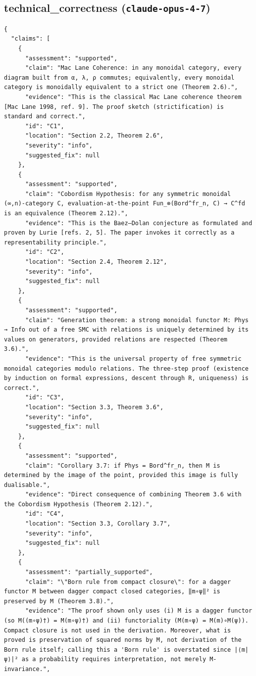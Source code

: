 \documentclass[11pt]{article}
\begin{document}
\subsection*{technical_correctness (\texttt{claude-opus-4-7})}
\begin{verbatim}
{
  "claims": [
    {
      "assessment": "supported",
      "claim": "Mac Lane Coherence: in any monoidal category, every diagram built from α, λ, ρ commutes; equivalently, every monoidal category is monoidally equivalent to a strict one (Theorem 2.6).",
      "evidence": "This is the classical Mac Lane coherence theorem [Mac Lane 1998, ref. 9]. The proof sketch (strictification) is standard and correct.",
      "id": "C1",
      "location": "Section 2.2, Theorem 2.6",
      "severity": "info",
      "suggested_fix": null
    },
    {
      "assessment": "supported",
      "claim": "Cobordism Hypothesis: for any symmetric monoidal (∞,n)-category C, evaluation-at-the-point Fun_⊗(Bord^fr_n, C) → C^fd is an equivalence (Theorem 2.12).",
      "evidence": "This is the Baez–Dolan conjecture as formulated and proven by Lurie [refs. 2, 5]. The paper invokes it correctly as a representability principle.",
      "id": "C2",
      "location": "Section 2.4, Theorem 2.12",
      "severity": "info",
      "suggested_fix": null
    },
    {
      "assessment": "supported",
      "claim": "Generation theorem: a strong monoidal functor M: Phys → Info out of a free SMC with relations is uniquely determined by its values on generators, provided relations are respected (Theorem 3.6).",
      "evidence": "This is the universal property of free symmetric monoidal categories modulo relations. The three-step proof (existence by induction on formal expressions, descent through R, uniqueness) is correct.",
      "id": "C3",
      "location": "Section 3.3, Theorem 3.6",
      "severity": "info",
      "suggested_fix": null
    },
    {
      "assessment": "supported",
      "claim": "Corollary 3.7: if Phys = Bord^fr_n, then M is determined by the image of the point, provided this image is fully dualisable.",
      "evidence": "Direct consequence of combining Theorem 3.6 with the Cobordism Hypothesis (Theorem 2.12).",
      "id": "C4",
      "location": "Section 3.3, Corollary 3.7",
      "severity": "info",
      "suggested_fix": null
    },
    {
      "assessment": "partially_supported",
      "claim": "\"Born rule from compact closure\": for a dagger functor M between dagger compact closed categories, ‖m∘ψ‖² is preserved by M (Theorem 3.8).",
      "evidence": "The proof shown only uses (i) M is a dagger functor (so M((m∘ψ)†) = M(m∘ψ)†) and (ii) functoriality (M(m∘ψ) = M(m)∘M(ψ)). Compact closure is not used in the derivation. Moreover, what is proved is preservation of squared norms by M, not derivation of the Born rule itself; calling this a 'Born rule' is overstated since |⟨m|ψ⟩|² as a probability requires interpretation, not merely M-invariance.",

\end{verbatim}
\end{document}

